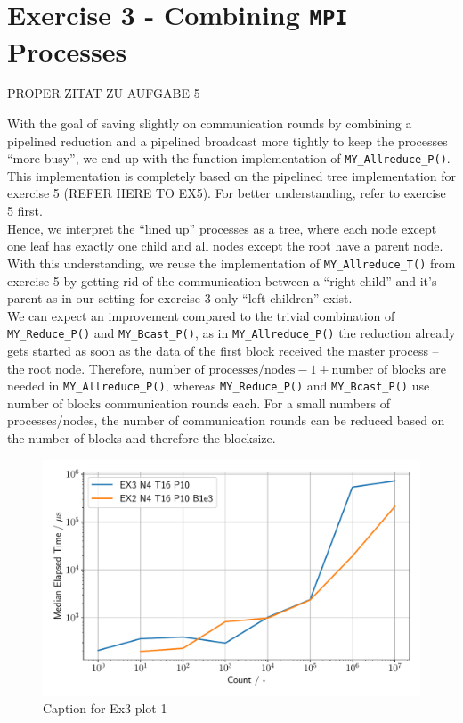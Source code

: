 \section{Exercise 3 - Combining \texttt{MPI} Processes}

PROPER ZITAT ZU AUFGABE 5

With the goal of saving slightly on communication rounds by combining a pipelined reduction and a 
pipelined broadcast more tightly to keep the processes “more busy”, we end up with the function implementation 
of \texttt{MY\_Allreduce\_P()}. This implementation is completely based on the pipelined tree 
implementation for exercise 5 (REFER HERE TO EX5). For better understanding, refer to exercise 5 first.\\

Hence, we interpret the “lined up” processes as a tree, where each node except one leaf has exactly 
one child and all nodes except the root have a parent node. With this understanding, we reuse the 
implementation of \texttt{MY\_Allreduce\_T()} from exercise 5 by getting rid of the communication between 
a “right child” and it’s parent as in our setting for exercise 3 only “left children” exist.\\

We can expect an improvement compared to the trivial combination of \texttt{MY\_Reduce\_P()} and 
\texttt{MY\_Bcast\_P()}, as in \texttt{MY\_Allreduce\_P()} the reduction already gets started as soon 
as the data of the first block received the master process -- the root node. Therefore, 
$\text{number of processes/nodes} - 1 + \text{number of blocks}$ are needed in \texttt{MY\_Allreduce\_P()}, 
whereas \texttt{MY\_Reduce\_P()} and \texttt{MY\_Bcast\_P()} use $\text{number of blocks}$ communication rounds 
each. For a small numbers of processes/nodes, the number of communication rounds can be reduced based 
on the number of blocks and therefore the blocksize.\\

\begin{figure}[h]
    \begin{center}
        \includegraphics[width=1.0\linewidth]{figures/Ex3_1.pdf}
        \caption{Caption for Ex3 plot 1}
        \label{Ex3_1_p}
    \end{center}
\end{figure}

